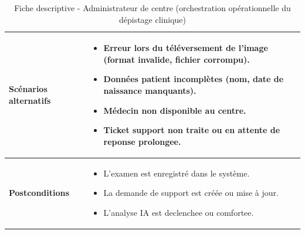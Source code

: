\begin{table}[H]
\begin{tabular}{|p{5cm}|p{10cm}|}
\textbf{Scénarios alternatifs} &
\begin{itemize}
\item Erreur lors du téléversement de l'image (format invalide, fichier corrompu).
\item Données patient incomplètes (nom, date de naissance manquants).
\item Médecin non disponible au centre.
\item Ticket support non traite ou en attente de reponse prolongee.
\end{itemize} \\ \hline

\textbf{Postconditions} & 
\begin{itemize}
\item L'examen est enregistré dans le système.
\item La demande de support est créée ou mise à jour.
\item L'analyse IA est declenchee ou comfortee.
\end{itemize} \\ \hline
\end{tabular}
\caption{Fiche descriptive - Administrateur de centre (orchestration opérationnelle du dépistage clinique)}
\end{table}

